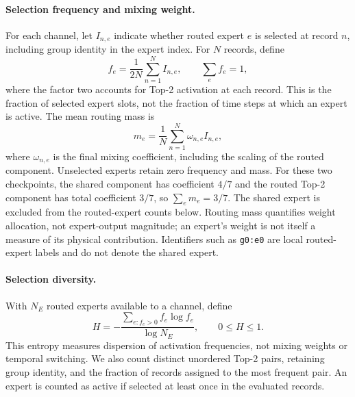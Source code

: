 \paragraph{Selection frequency and mixing weight.}
For each channel, let $I_{n,e}$ indicate whether routed expert $e$ is
selected at record $n$, including group identity in the expert index.
For $N$ records, define
\begin{equation}
f_e=\frac{1}{2N}\sum_{n=1}^{N}I_{n,e},
\qquad \sum_e f_e=1,
\label{eq:app_routing_frequency}
\end{equation}
where the factor two accounts for Top-2 activation at each record.
This is the fraction of selected expert slots, not the fraction of
time steps at which an expert is active. The mean routing mass is
\begin{equation}
m_e=\frac{1}{N}\sum_{n=1}^{N}\omega_{n,e}I_{n,e},
\label{eq:app_routing_mass}
\end{equation}
where $\omega_{n,e}$ is the final mixing coefficient, including the
scaling of the routed component. Unselected experts retain zero
frequency and mass. For these two checkpoints, the shared component
has coefficient $4/7$ and the routed Top-2 component has total
coefficient $3/7$, so $\sum_e m_e=3/7$.
The shared expert is excluded from the routed-expert counts below.
Routing mass quantifies weight allocation, not expert-output magnitude;
an expert's weight is not itself a measure of its physical contribution.
Identifiers such as \texttt{g0:e0} are local routed-expert labels and
do not denote the shared expert.

\paragraph{Selection diversity.}
With $N_E$ routed experts available to a channel, define
\begin{equation}
H=-\frac{\sum_{e:f_e>0}f_e\log f_e}{\log N_E},
\qquad 0\leq H\leq1.
\label{eq:app_routing_entropy}
\end{equation}
This entropy measures dispersion of activation frequencies, not mixing
weights or temporal switching. We also count distinct unordered Top-2
pairs, retaining group identity, and the fraction of records assigned
to the most frequent pair. An expert is counted as active if selected
at least once in the evaluated records.

